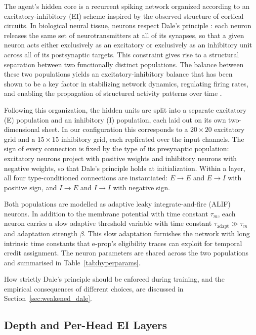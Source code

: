 The agent's hidden core is a recurrent spiking network organized according to an
excitatory-inhibitory (EI) scheme inspired by the observed structure of cortical
circuits. In biological neural tissue, neurons respect Dale's principle
\cite{dale1935pharmacology}: each neuron releases the same set of neurotransmitters
at all of its synapses, so that a given neuron acts either exclusively as an excitatory
or exclusively as an inhibitory unit across all of its postsynaptic targets. This
constraint gives rise to a structural separation between two functionally distinct
populations. The balance between these two populations yields an excitatory-inhibitory balance that has been shown to be a key
factor in stabilizing network dynamics, regulating firing rates, and enabling the
propagation of structured activity patterns over time \cite{vanVreeswijk1996Chaos}.

Following this organization, the hidden units are split into a separate excitatory (E)
population and an inhibitory (I) population, each laid out on its own two-dimensional
sheet. In our configuration this corresponds to a $20 \times 20$ excitatory grid and a
$15 \times 15$ inhibitory grid, each replicated over the input channels. The sign of
every connection is fixed by the type of its presynaptic population: excitatory neurons
project with positive weights and inhibitory neurons with negative weights, so that
Dale's principle holds at initialization. Within a layer, all four type-conditioned
connections are instantiated: $E \to E$ and $E \to I$ with positive sign, and $I \to E$
and $I \to I$ with negative sign.

Both populations are modelled as adaptive leaky integrate-and-fire (ALIF) neurons. In
addition to the membrane potential with time constant $\tau_m$, each neuron carries a
slow adaptive threshold variable with time constant $\tau_\text{adapt} \gg \tau_m$ and
adaptation strength $\beta$. This slow adaptation furnishes the network with long
intrinsic time constants that e-prop's eligibility traces can exploit for temporal
credit assignment. The neuron parameters are shared
across the two populations and summarised in Table~\ref{tab:hyperparams}.

How strictly Dale's principle should be enforced during training, and the empirical
consequences of different choices, are discussed in Section~\ref{sec:weakened_dale}.

\subsection{Depth and Per-Head EI Layers}
\label{sec:depth_ei}

